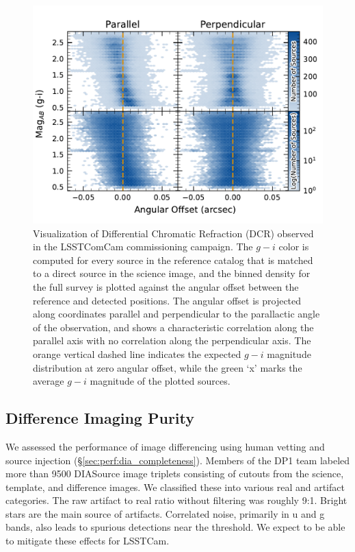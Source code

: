 \begin{figure}[htb!]
\centering
\includegraphics[width=0.98\linewidth]{dcrHexbin.pdf}
\caption{Visualization of \gls{Differential Chromatic Refraction} (DCR) observed in the  LSSTComCam commissioning campaign. The $g-i$ color is computed for every source in the reference catalog that is matched to a direct source in the science image, and the binned density for the full survey is plotted against the angular offset between the reference and detected positions. The angular offset is projected along coordinates parallel and perpendicular to the parallactic angle of the observation, and shows a characteristic correlation along the parallel axis with no correlation along the perpendicular axis. The orange vertical dashed line indicates the expected $g-i$ magnitude distribution at zero angular offset, while the green ‘x’ marks the average $g-i$ magnitude of the plotted sources.}
\label{fig:dcr}
\vspace{0.1cm}
\end{figure}


\subsection{Difference Imaging Purity} \label{sec:performance:dia}

We assessed the performance of image differencing using human vetting and source injection (\S \ref{sec:perf:dia_completeness}).
Members of the \gls{DP1} team labeled more than 9500 DIASource image triplets consisting of cutouts from the science, template, and difference images.
We classified these into various real and artifact categories.
The raw artifact to real ratio without filtering was roughly 9:1.
Bright stars are the main source of artifacts.
Correlated noise, primarily in u and g bands, also leads to spurious detections near the threshold.
We expect to be able to mitigate these effects for \gls{LSSTCam}.

